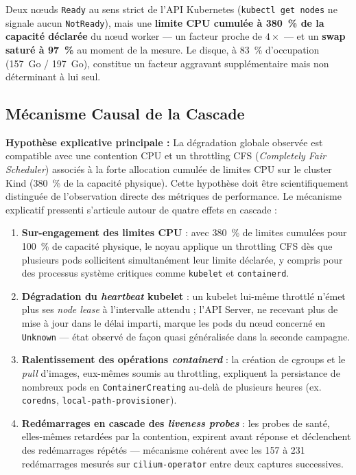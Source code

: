 Deux nœuds \texttt{Ready} au sens strict de l'API Kubernetes (\texttt{kubectl get nodes} ne signale aucun \texttt{NotReady}), mais une \textbf{limite CPU cumulée à 380~\% de la capacité déclarée} du nœud worker — un facteur proche de $4\times$ — et un \textbf{swap saturé à 97~\%} au moment de la mesure. Le disque, à 83~\% d'occupation (157~Go / 197~Go), constitue un facteur aggravant supplémentaire mais non déterminant à lui seul.

\subsection{Mécanisme Causal de la Cascade}

\textbf{Hypothèse explicative principale :} La dégradation globale observée est compatible avec une contention CPU et un throttling CFS (\textit{Completely Fair Scheduler}) associés à la forte allocation cumulée de limites CPU sur le cluster Kind (380~\% de la capacité physique). Cette hypothèse doit être scientifiquement distinguée de l'observation directe des métriques de performance. Le mécanisme explicatif pressenti s'articule autour de quatre effets en cascade :

\begin{enumerate}
    \item \textbf{Sur-engagement des limites CPU} : avec 380~\% de limites cumulées pour 100~\% de capacité physique, le noyau applique un throttling CFS dès que plusieurs pods sollicitent simultanément leur limite déclarée, y compris pour des processus système critiques comme \texttt{kubelet} et \texttt{containerd}.
    \item \textbf{Dégradation du \textit{heartbeat} kubelet} : un kubelet lui-même throttlé n'émet plus ses \textit{node lease} à l'intervalle attendu ; l'API Server, ne recevant plus de mise à jour dans le délai imparti, marque les pods du nœud concerné en \texttt{Unknown} — état observé de façon quasi généralisée dans la seconde campagne.
    \item \textbf{Ralentissement des opérations \textit{containerd}} : la création de cgroups et le \textit{pull} d'images, eux-mêmes soumis au throttling, expliquent la persistance de nombreux pods en \texttt{ContainerCreating} au-delà de plusieurs heures (ex. \texttt{coredns}, \texttt{local-path-provisioner}).
    \item \textbf{Redémarrages en cascade des \textit{liveness probes}} : les probes de santé, elles-mêmes retardées par la contention, expirent avant réponse et déclenchent des redémarrages répétés — mécanisme cohérent avec les 157 à 231 redémarrages mesurés sur \texttt{cilium-operator} entre deux captures successives.
\end{enumerate}

